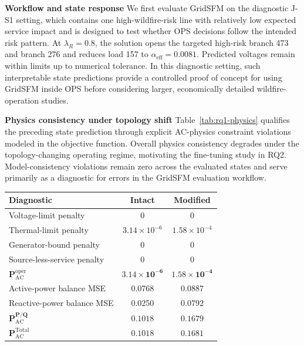\documentclass{article}
\begin{document}
\noindent\textbf{Workflow and state response}\enspace
We first evaluate GridSFM on the diagnostic J-S1 setting, which contains one
high-wildfire-risk line with relatively low expected service impact and is
designed to test whether OPS decisions follow the intended risk pattern.
At \(\lambda_R=0.8\), the solution opens the targeted high-risk branch 473 and branch 276 and reduces load 157 to \(\alpha_{\mathrm{eff}}=0.0081\). Predicted voltages remain within limits up to numerical tolerance. In this diagnostic setting, such interpretable state predictions provide a controlled
proof of concept for using GridSFM inside OPS before considering larger,
economically detailed wildfire-operation studies.


\noindent
\begin{minipage}[t]{0.49\linewidth}
\vspace{0pt}
\textbf{Physics consistency under topology shift}\enspace
Table~\ref{tab:rq1-physics} qualifies the preceding state prediction through
explicit AC-physics constraint violations modeled in the objective function.
Overall physics consistency degrades under the topology-changing operating
regime, motivating the fine-tuning study in RQ2. Model-consistency violations
remain zero across the evaluated states and serve primarily as a diagnostic
for errors in the GridSFM evaluation workflow.
\end{minipage}%
\hfill%
\begin{minipage}[t]{0.48\linewidth}
\vspace{-3pt}
\centering
\begingroup
\setlength{\abovecaptionskip}{0pt}
\setlength{\belowcaptionskip}{2pt}

\label{tab:rq1-physics}

\footnotesize
\renewcommand{\arraystretch}{0.92}
\begin{tabular*}{\linewidth}{@{\extracolsep{\fill}}lcc@{}}
\toprule
Diagnostic & Intact & Modified \\
\midrule
Voltage-limit penalty
    & 0 & 0 \\
Thermal-limit penalty
    & $3.14{\times}10^{-6}$ & $1.58{\times}10^{-4}$ \\
Generator-bound penalty
    & 0 & 0 \\
Source-less-service penalty
    & 0 & 0 \\
$\mathbf{P_{\mathrm{AC}}^{\mathrm{oper}}}$
    & $\mathbf{3.14{\times}10^{-6}}$
    & $\mathbf{1.58{\times}10^{-4}}$ \\
Active-power balance MSE
    & 0.0768 & 0.0887 \\
Reactive-power balance MSE
    & 0.0250 & 0.0792 \\
$\mathbf{P_{\mathrm{AC}}^{P/Q}}$
    & $\mathbf{0.1018}$ & $\mathbf{0.1679}$ \\
\midrule
$\mathbf{P_{\mathrm{AC}}^{\mathrm{Total}}}$
    & $\mathbf{0.1018}$ & $\mathbf{0.1681}$ \\
\bottomrule
\end{tabular*}

\endgroup
\end{minipage}%
\par\vspace{-3pt}
\end{document}
